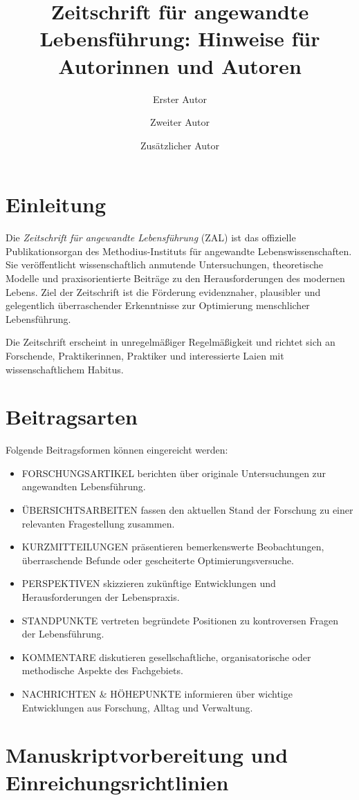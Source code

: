 \documentclass[research]{zal}
\title{Zeitschrift für angewandte Lebensführung: Hinweise für Autorinnen und Autoren}
\author[1,*]{Erster Autor}
\author[2,*]{Zweiter Autor}
\author[1,2,+]{Zusätzlicher Autor}
\begin{document}
\section{Einleitung}

Die \emph{Zeitschrift für angewandte Lebensführung} (ZAL) ist das offizielle
Publikationsorgan des Methodius-Instituts für angewandte Lebenswissenschaften.
Sie veröffentlicht wissenschaftlich anmutende Untersuchungen, theoretische
Modelle und praxisorientierte Beiträge zu den Herausforderungen des modernen
Lebens. Ziel der Zeitschrift ist die Förderung evidenznaher, plausibler und
gelegentlich überraschender Erkenntnisse zur Optimierung menschlicher
Lebensführung.

Die Zeitschrift erscheint in unregelmäßiger Regelmäßigkeit und richtet sich
an Forschende, Praktikerinnen, Praktiker und interessierte Laien mit
wissenschaftlichem Habitus.

\section{Beitragsarten}

Folgende Beitragsformen können eingereicht werden:

\begin{itemize}
	\item FORSCHUNGSARTIKEL berichten über originale Untersuchungen zur angewandten Lebensführung.
	\item ÜBERSICHTSARBEITEN fassen den aktuellen Stand der Forschung zu einer relevanten Fragestellung zusammen.
	\item KURZMITTEILUNGEN präsentieren bemerkenswerte Beobachtungen, überraschende Befunde oder gescheiterte Optimierungsversuche.
	\item PERSPEKTIVEN skizzieren zukünftige Entwicklungen und Herausforderungen der Lebenspraxis.
	\item STANDPUNKTE vertreten begründete Positionen zu kontroversen Fragen der Lebensführung.
	\item KOMMENTARE diskutieren gesellschaftliche, organisatorische oder methodische Aspekte des Fachgebiets.
	\item NACHRICHTEN \& HÖHEPUNKTE informieren über wichtige Entwicklungen aus Forschung, Alltag und Verwaltung.
\end{itemize}

\section{Manuskriptvorbereitung und Einreichungsrichtlinien}
\end{document}
